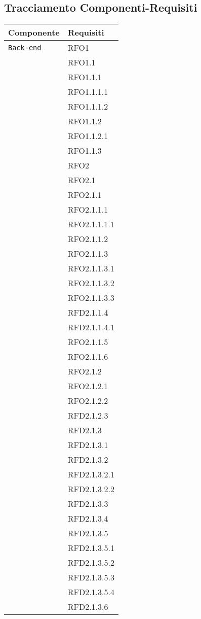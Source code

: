 \subsection{Tracciamento Componenti-Requisiti}
\normalsize
\begin{longtable}{|>{\centering}m{10cm}|m{3cm}<{\centering}|}
\hline 
\textbf{Componente} & \textbf{Requisiti}\\
\hline
\endhead
\hyperref[Back-end]{\texttt{Back-end}} & RFO1\\
& RFO1.1\\
& RFO1.1.1\\
& RFO1.1.1.1\\
& RFO1.1.1.2\\
& RFO1.1.2\\
& RFO1.1.2.1\\
& RFO1.1.3\\
& RFO2\\
& RFO2.1\\
& RFO2.1.1\\
& RFO2.1.1.1\\
& RFO2.1.1.1.1\\
& RFO2.1.1.2\\
& RFO2.1.1.3\\
& RFO2.1.1.3.1\\
& RFO2.1.1.3.2\\
& RFO2.1.1.3.3\\
& RFD2.1.1.4\\
& RFD2.1.1.4.1\\
& RFO2.1.1.5\\
& RFO2.1.1.6\\
& RFO2.1.2\\
& RFO2.1.2.1\\
& RFO2.1.2.2\\
& RFD2.1.2.3\\
& RFD2.1.3\\
& RFD2.1.3.1\\
& RFD2.1.3.2\\
& RFD2.1.3.2.1\\
& RFD2.1.3.2.2\\
& RFD2.1.3.3\\
& RFD2.1.3.4\\
& RFD2.1.3.5\\
& RFD2.1.3.5.1\\
& RFD2.1.3.5.2\\
& RFD2.1.3.5.3\\
& RFD2.1.3.5.4\\
& RFD2.1.3.6\\

\end{longtable}
